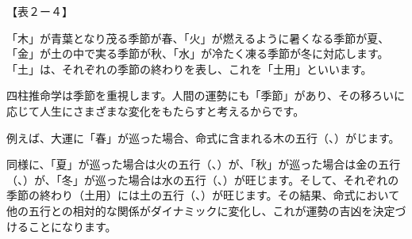 \documentclass[a4paper,11pt,twocolumn,dvipdfmx]{tarticle}
\begin{document}
【表２ー４】

「木」が青葉となり茂る季節が春、「火」が燃えるように暑くなる季節が夏、「金」が土の中で実る季節が秋、「水」が冷たく凍る季節が冬に対応します。「土」は、それぞれの季節の終わりを表し、これを「土用」といいます。

四柱推命学は季節を重視します。人間の運勢にも「季節」があり、その移ろいに応じて人生にさまざまな変化をもたらすと考えるからです。

例えば、大運に「春」が巡った場合、命式に含まれる木の五行（、）がじます。

同様に、「夏」が巡った場合は火の五行（、）が、「秋」が巡った場合は金の五行（、）が、「冬」が巡った場合は水の五行（、）が旺じます。そして、それぞれの季節の終わり（土用）には土の五行（、）が旺じます。その結果、命式において他の五行との相対的な関係がダイナミックに変化し、これが運勢の吉凶を決定づけることになります。
\end{document}
